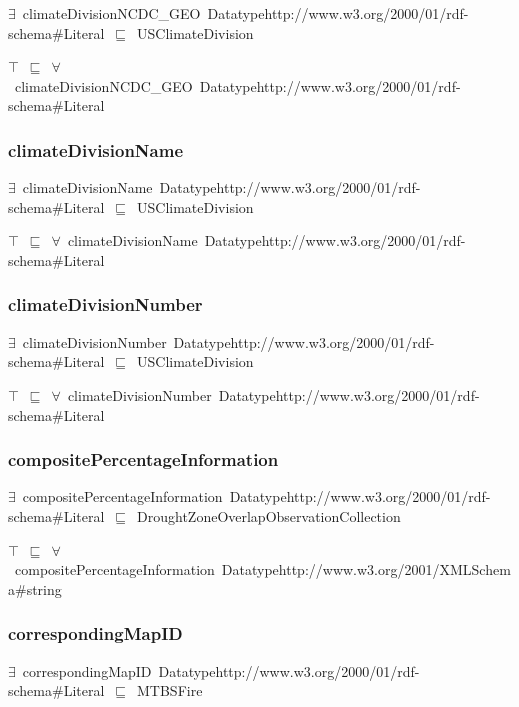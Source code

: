 \documentclass{article}
\begin{document}
\ensuremath{\exists}~climateDivisionNCDC\_GEO~Datatypehttp://www.w3.org/2000/01/rdf-schema#Literal~\ensuremath{\sqsubseteq}~USClimateDivision

\ensuremath{\top}~\ensuremath{\sqsubseteq}~\ensuremath{\forall}~climateDivisionNCDC\_GEO~Datatypehttp://www.w3.org/2000/01/rdf-schema#Literal

\subsubsection*{climateDivisionName}

\ensuremath{\exists}~climateDivisionName~Datatypehttp://www.w3.org/2000/01/rdf-schema#Literal~\ensuremath{\sqsubseteq}~USClimateDivision

\ensuremath{\top}~\ensuremath{\sqsubseteq}~\ensuremath{\forall}~climateDivisionName~Datatypehttp://www.w3.org/2000/01/rdf-schema#Literal

\subsubsection*{climateDivisionNumber}

\ensuremath{\exists}~climateDivisionNumber~Datatypehttp://www.w3.org/2000/01/rdf-schema#Literal~\ensuremath{\sqsubseteq}~USClimateDivision

\ensuremath{\top}~\ensuremath{\sqsubseteq}~\ensuremath{\forall}~climateDivisionNumber~Datatypehttp://www.w3.org/2000/01/rdf-schema#Literal

\subsubsection*{compositePercentageInformation}

\ensuremath{\exists}~compositePercentageInformation~Datatypehttp://www.w3.org/2000/01/rdf-schema#Literal~\ensuremath{\sqsubseteq}~DroughtZoneOverlapObservationCollection

\ensuremath{\top}~\ensuremath{\sqsubseteq}~\ensuremath{\forall}~compositePercentageInformation~Datatypehttp://www.w3.org/2001/XMLSchema#string

\subsubsection*{correspondingMapID}

\ensuremath{\exists}~correspondingMapID~Datatypehttp://www.w3.org/2000/01/rdf-schema#Literal~\ensuremath{\sqsubseteq}~MTBSFire
\end{document}
